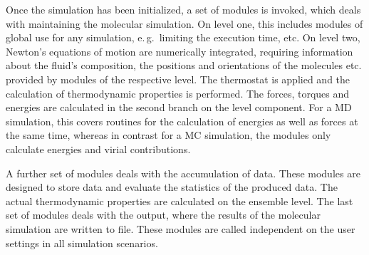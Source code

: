 Once the simulation has been initialized, a set of modules is invoked, which deals with maintaining the molecular simulation. On level one, this includes modules of global use for any simulation, e.\,g.~limiting the execution time, etc. On level two, Newton's equations of motion are numerically integrated, requiring information about the fluid's composition, the positions and orientations of the molecules etc. provided by modules of the respective level. The thermostat is applied and the calculation of thermodynamic properties is performed. The forces, torques and energies are calculated  in the second branch on the level component. For a MD simulation, this covers routines for the calculation of energies as well as forces at the same time, whereas in contrast for a MC simulation, the modules only calculate energies and virial contributions. 

A further set of modules deals with the accumulation of data. These modules are designed to store data and evaluate the statistics of the produced data. The actual thermodynamic properties are calculated on the ensemble level. The last set of modules deals with the output, where the results of the molecular simulation are written to file. These modules are called independent on the user settings in all simulation scenarios. 

